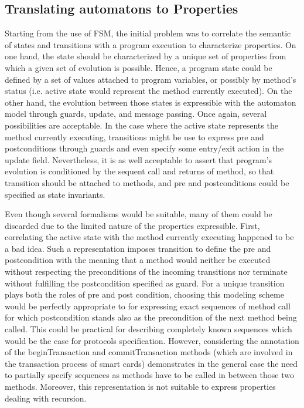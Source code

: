 \subsection{Translating automatons to Properties}
Starting from the use of FSM, the initial problem was to correlate the semantic of states and transitions with a program execution to characterize properties. On one hand, the state should be characterized by a unique set of properties from which a given set of evolution is possible. Hence, a program state could be defined by a set of values attached to program variables, or possibly by method's status (i.e. active state would represent the method currently executed). On the other hand, the evolution between those states is expressible with the automaton model through guards, update, and message passing. Once again, several possibilities are acceptable. In the case where the active state represents the method currently executing, transitions might be use to express pre and postconditions through guards and even specify some entry/exit action in the update field. Nevertheless, it is as well acceptable to assert that program's evolution is conditioned by the sequent call and returns of method, so that transition should be attached to methods, and pre and postconditions could be specified as state invariants.

Even though several formalisms would be suitable, many of them could be discarded due to the limited nature of the properties expressible. First, correlating the active state with the method currently executing happened to be a bad idea. Such a representation imposes transition to define the pre and postcondition with the meaning that a method would neither be executed without respecting the preconditions of the incoming transitions nor terminate without fulfilling the postcondition specified as guard. For a unique transition plays both the roles of pre and post condition, choosing this modeling scheme would be perfectly appropriate to for expressing exact sequences of method call for which postcondition stands also as the precondition of the next method being called. This could be practical for describing completely known sequences which would be the case for protocols specification. However, considering the annotation of the beginTransaction and commitTransaction methods (which are involved in the transaction process of smart cards) demonstrates in the general case the need to partially specify sequences as methods have to be called in between those two methods. Moreover, this representation is not suitable to express properties dealing with recursion.

